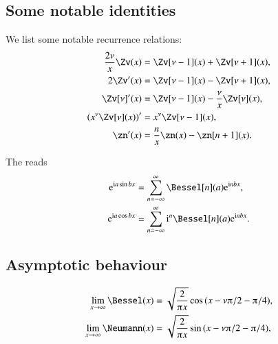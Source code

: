\subsection{Some notable identities}
    We list some notable recurrence relations:
    \begin{subequations}
        \begin{align}
           \frac{2\nu}{x}\Zv(x) &= \Zv[\nu-1](x) + \Zv[\nu+1](x), \\
            2\Zv'(x) &= \Zv[\nu-1](x) - \Zv[\nu+1](x), \\
            \Zv[\nu]'(x) &= \Zv[\nu-1](x) - \frac{\nu}{x}\Zv[\nu](x), \\
            \pclosed{x^\nu \Zv[\nu](x)}' &= x^\nu \Zv[\nu-1] (x), \\
            \zn'(x) &= \frac{n}{x}\zn(x) -\zn[n+1](x).
        \end{align}
    \end{subequations}


    The  reads
    \begin{subequations}\label{eq:cylinder:Jacobi_Anger}
        \begin{align}
            \eu[\im a \sin{bx}]  &= \sum_{n=-\infty}^{\infty} \Bessel[n](a) \eu[\im n bx],\label{eq:cylinder:Jacobi_Anger_sin} \\
            \eu[\im a \cos{bx}]  &= \sum_{n=-\infty}^{\infty} \im^{n}\Bessel[n](a) \eu[\im n bx] \label{eq:cylinder:Jacobi_Anger_cos}.
        \end{align}
    \end{subequations}
    


\subsection{Asymptotic behaviour}

    \begin{subequations}\label{eq:cylinder:prop:JacobiAnger}
        \begin{align}
            \lim_{x\to \infty} \Bessel(x) &=
            \sqrt{\frac{2}{\ppi x}} \cos{(x - \nu \ppi/2 - \ppi/4)}, \label{eq:cylinder:prop:JacobiAnger_sin}  \\
            \lim_{x\to \infty} \Neumann(x) &=
            \sqrt{\frac{2}{\ppi x}} \sin{(x - \nu \ppi/2 - \ppi/4)},\label{eq:cylinder:prop:JacobiAnger_cos} 
        \end{align}
    \end{subequations}


